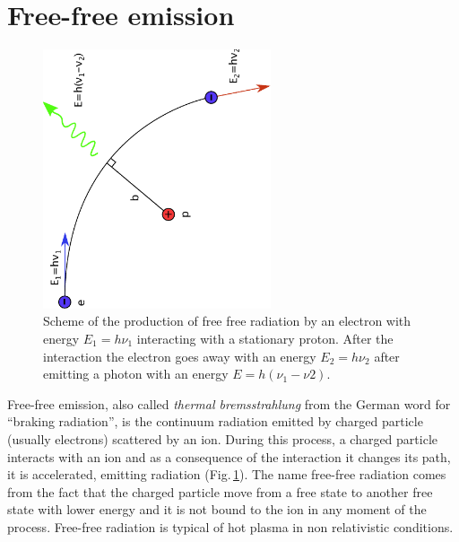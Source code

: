\documentclass[../main.tex]{subfiles}
\begin{document}
\section{Free-free emission}

\begin{figure}
\centering
\includegraphics[width=0.6\textwidth, angle =270]{images/free_free.pdf} 
\caption[]{Scheme of the production of free free radiation by an electron with energy $E_1 = h\nu_1$ interacting with a stationary proton. After the interaction the electron goes away with an energy $E_2=h\nu_2$ after emitting a photon with an energy $E=h(\nu_1-\nu2)$.}
\label{fig:free_free}
\end{figure}

Free-free emission, also called \emph{thermal bremsstrahlung} from the German word for ``braking radiation'', is the continuum radiation emitted by charged particle (usually electrons) scattered by an ion.
During this process, a charged particle interacts with an ion and as a consequence of the interaction it changes its path, it is accelerated, emitting radiation (Fig.\,\ref{fig:free_free}).
The name free-free radiation comes from the fact that the charged particle move from a free state to another free state with lower energy and it is not bound to the ion in any moment of the process.
Free-free radiation is typical of hot plasma in non relativistic conditions.
\end{document}
